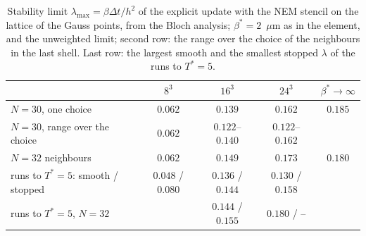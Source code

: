 \begin{table}[htbp]
  \centering
  \caption[Stability limit of the NEM stencil]{Stability limit
    $\lambda_{\max}=\beta\Delta t/h^2$ of the explicit update with the NEM
    stencil on the lattice of the Gauss points, from the Bloch analysis;
    $\beta^*=2$~$\mu$m as in the element, and the unweighted limit; second
    row: the range over the choice of the neighbours in the last shell. Last
    row: the largest smooth and the smallest stopped $\lambda$ of the runs to
    $T^*=5$.}
  \label{tab:app-stability}
  \small
  \begin{tabular}{lcccc}
    \toprule
    & $8^3$ & $16^3$ & $24^3$ & $\beta^*\to\infty$ \\
    \midrule
    $N=30$, one choice & $0.062$ & $0.139$ & $0.162$ & $0.185$ \\
    $N=30$, range over the choice & $0.062$ & $0.122$--$0.140$ & $0.122$--$0.162$ & \\
    $N=32$ neighbours & $0.062$ & $0.149$ & $0.173$ & $0.180$ \\
    runs to $T^*=5$: smooth / stopped & $0.048$ / $0.080$ & $0.136$ / $0.144$ & $0.130$ / $0.158$ & \\
    runs to $T^*=5$, $N=32$ & & $0.144$ / $0.155$ & $0.180$ / -- & \\
    \bottomrule
  \end{tabular}
\end{table}
